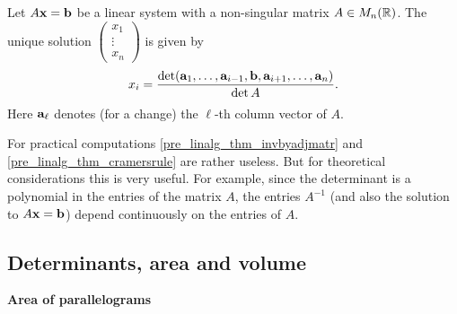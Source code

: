 \documentclass[10pt, a4paper]{article}
\begin{document}
\begin{theorem}\label{pre_linalg_thm_cramersrule}
    Let $A\mathbf{x} = \mathbf{b}$ be a linear system with a non-singular matrix $A \in M_n(\mathbb{R})$.
    The unique solution $\begin{pmatrix}
        x_1 \\ \vdots \\ x_n
    \end{pmatrix}$ is given by
    \[
    x_i = \frac{\det(\mathbf{a}_1, \dotsc, \mathbf{a}_{i - 1}, \mathbf{b}, \mathbf{a}_{i + 1}, \dotsc, \mathbf{a}_n)}{\det A}.
    \]
    Here $\mathbf{a}_\ell$ denotes (for a change) the $\ell$-th column vector of $A$.
\end{theorem}

\begin{remark}
    For practical computations \autoref{pre_linalg_thm_invbyadjmatr} and \autoref{pre_linalg_thm_cramersrule} are rather useless.
    But for theoretical considerations this is very useful.
    For example,
    since the determinant is a polynomial in the entries of the matrix $A$,
    the entries $A ^ {-1}$
    (and also the solution to $A\mathbf{x} = \mathbf{b}$)
    depend continuously on the entries of $A$.
\end{remark}

\subsection{Determinants, area and volume}

\textbf{Area of parallelograms}
\end{document}

